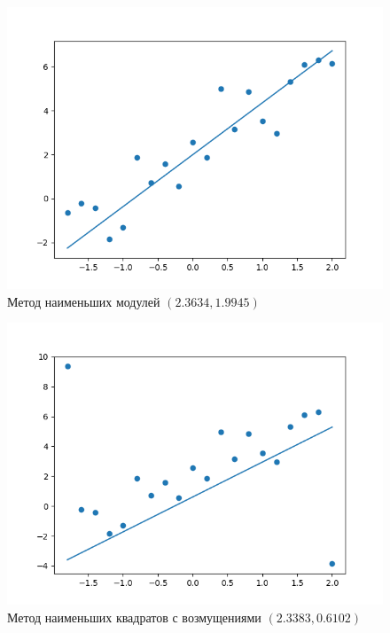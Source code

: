 \documentclass[12pt,a4paper]{article}
\begin{document}
	\begin{figure}[htbp!]
		\begin{center}
			\includegraphics[width = 1\linewidth]{graphics/lab6_la}
			\caption{Метод наименьших модулей \( (2.3634, 1.9945) \)}
		\end{center}
	\end{figure}

	\begin{figure}[htbp!]
		\begin{center}
			\includegraphics[width = 1\linewidth]{graphics/lab6_ls_outliners}
			\caption{Метод наименьших квадратов с возмущениями
				\( (2.3383, 0.6102) \)}
		\end{center}
	\end{figure}
\end{document}
